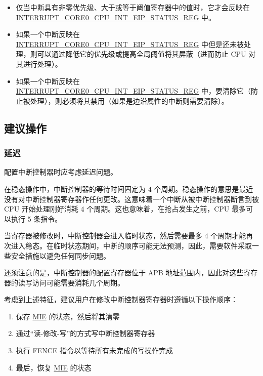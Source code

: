 \documentclass[main\_\_CN.tex]{subfiles}
\begin{document}
\begin{itemize}
    \item 仅当中断具有非零优先级、大于或等于阈值寄存器中的值时，它才会反映在 \hyperref[regdesc:INTERRUPTCORE0CPUINTEIPSTATUSREG]{INTERRUPT\_CORE0\_CPU\_INT\_EIP\_STATUS\_REG} 中。
    \item 如果一个中断反映在 \hyperref[regdesc:INTERRUPTCORE0CPUINTEIPSTATUSREG]{INTERRUPT\_CORE0\_CPU\_INT\_EIP\_STATUS\_REG} 中但是还未被处理，则可以通过降低它的优先级或提高全局阈值将其屏蔽（进而防止 CPU 对其进行处理）。
    \item 如果一个中断反映在\\ \hyperref[regdesc:INTERRUPTCORE0CPUINTEIPSTATUSREG]{INTERRUPT\_CORE0\_CPU\_INT\_EIP\_STATUS\_REG} 中，要清除它（防止被处理），则必须将其禁用（如果是边沿属性的中断则需要清除）。
\end{itemize}

\subsection{建议操作}
\label{sec:riscvcpu-int-suggest-op}

\subsubsection{延迟}
\label{sec:riscvcpu-int-latency}

配置中断控制器时应考虑延迟问题。

在稳态操作中，中断控制器的等待时间固定为 4 个周期。稳态操作的意思是最近没有对中断控制器寄存器作任何更改。这意味着一个中断从被中断控制器断言到被 CPU 开始处理刚好消耗 4 个周期。这也意味着，在抢占发生之前，CPU 最多可以执行 5 条指令。

当寄存器被修改时，中断控制器会进入临时状态，然后需要最多 4 个周期才能再次进入稳态。在临时状态期间，中断的顺序可能无法预测，因此，需要软件采取一些安全措施以避免任何同步问题。
 
还须注意的是，中断控制器的配置寄存器位于 APB 地址范围内，因此对这些寄存器的读写访问可能需要消耗几个周期。
 
考虑到上述特征，建议用户在修改中断控制器寄存器时遵循以下操作顺序：

\begin{enumerate}
    \item 保存 \hyperref[fielddesc:MSTATUSMIE]{MIE} 的状态，然后将其清零
    \item 通过“读-修改-写”的方式写中断控制器寄存器
    \item 执行 FENCE 指令以等待所有未完成的写操作完成
    \item 最后，恢复 \hyperref[fielddesc:MSTATUSMIE]{MIE} 的状态
\end{enumerate}
\end{document}
